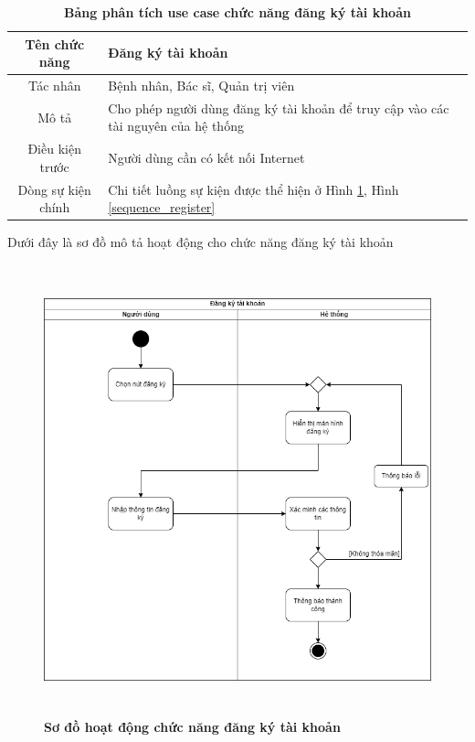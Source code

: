   \begin{table}[H]
    \caption{\bfseries \fontsize{12pt}{0pt}\selectfont Bảng phân tích use case chức năng đăng ký tài khoản}
    \centering
    \begin{tabularx}{0.9\textwidth}{|c|X|}
      \hline
      \textbf{Tên chức năng} & \textbf{Đăng ký tài khoản} \\
      \hline
      Tác nhân & Bệnh nhân, Bác sĩ, Quản trị viên \\
      \hline
      Mô tả & Cho phép người dùng đăng ký tài khoản để truy cập vào các tài nguyên của hệ thống 
       \\
      \hline
      Điều kiện trước & Người dùng cần có kết nối Internet \\
      \hline
      Dòng sự kiện chính & 
        Chi tiết luồng sự kiện được thể hiện ở Hình \ref{activity_register}, Hình \ref{sequence_register} 
        \\
      \hline
    \end{tabularx}
  \end{table}
  Dưới đây là sơ đồ mô tả hoạt động cho chức năng đăng ký tài khoản
  \begin{figure}[H]
    \centering
    \includegraphics[width=13.5cm,height=13cm]{Images/activity/activity_register.png}
    \caption[Sơ đồ hoạt động chức năng đăng ký tài khoản]{\bfseries \fontsize{12pt}{0pt}
    \selectfont Sơ đồ hoạt động chức năng đăng ký tài khoản}
    \label{activity_register} %
  \end{figure}

